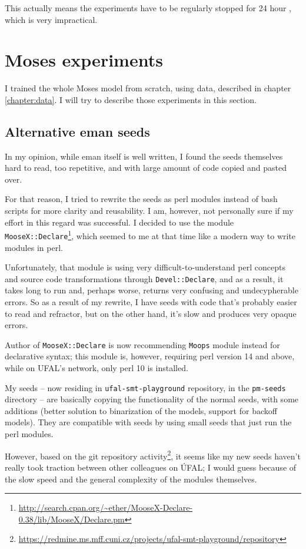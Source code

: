 This actually means the experiments have to be regularly stopped for 24 hour , which is very impractical.

\section{Moses experiments}
\label{experiments:moses}
I trained the whole Moses model from scratch, using data, de\-scri\-bed in cha\-pter \ref{chapter:data}. I will try to describe those experiments in this section.
\subsection{Alternative eman seeds}

In my opinion, while eman itself is well written, I found the seeds themselves hard to read, too repetitive, and with large amount of code copied and pasted over. 

For that reason, I tried to rewrite the seeds as perl modules instead of bash scripts for more clarity and reusability. I am, however, not personally sure if my effort in this regard was successful. I decided to use the module \texttt{MooseX::Declare}\footnote{\url{http://search.cpan.org/~ether/MooseX-Declare-0.38/lib/MooseX/Declare.pm}}, which seemed to me at that time like a modern way to write modules in perl. 

Unfortunately, that module is using very difficult-to-understand perl concepts and source code transformations through \texttt{Devel::Declare}, and as a result, it takes long to run and, perhaps worse, returns very confusing and undecypherable errors. 
So as a result of my rewrite, I have seeds with code that's probably easier to read and refractor, but on the other hand, it's slow and produces very opaque errors.

Author of \texttt{MooseX::Declare} is now recommending \texttt{Moops} module instead for declarative syntax; this module is, however, requiring perl version 14 and above, while on UFAL's network, only perl 10 is installed.

My  seeds -- now residing in \texttt{ufal-smt-playground} repository, in the \texttt{pm-seeds} directory -- are basically copying the functionality of the normal seeds, with some additions (better solution to binarization of the models, support for backoff models). They are compatible with  seeds by using small  seeds that just run the perl modules.

However, based on the git repository activity\footnote{\url{https://redmine.ms.mff.cuni.cz/projects/ufal-smt-playground/repository}}, it seems like my new seeds haven't really took traction between other colleagues on ÚFAL; I would guess because of the slow speed and the general complexity of the modules themselves.

